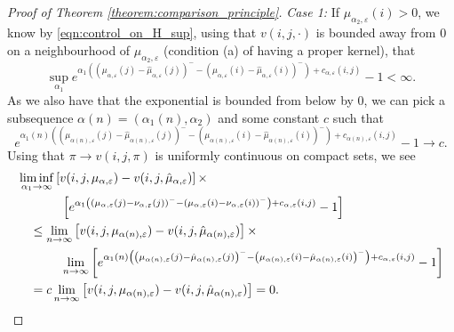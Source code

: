 \documentclass[a4paper]{article}
\numberwithin{equation}{section}
\theoremstyle{definition}
\begin{document}
\begin{proof}[Proof of Theorem \ref{theorem:comparison_principle}]
	\textit{Case 1:} If $\mu_{\alpha_2,\varepsilon}(i) > 0$, we know by \eqref{eqn:control_on_H_sup}, using that $v(i,j,\cdot)$ is bounded away from $0$ on a neighbourhood of $\mu_{\alpha_2,\varepsilon}$ (condition (a) of having a proper kernel), that 
	\begin{equation*}
		\sup_{\alpha_1} e^{\alpha_1\left(\left(\mu_{\alpha,\varepsilon}(j) - \hat{\mu}_{\alpha,\varepsilon}(j)\right)^- - \left(\mu_{\alpha,\varepsilon}(i) - \hat{\mu}_{\alpha,\varepsilon}(i)\right)^-\right) + c_{\alpha,\varepsilon}(i,j) } - 1 < \infty.
	\end{equation*}
	As we also have that the exponential is bounded from below by $0$, we can pick a subsequence $\alpha(n) = (\alpha_{1}(n),\alpha_2)$ and some constant $c$ such that 
	\begin{equation*}
		e^{\alpha_1(n) \left(\left(\mu_{\alpha(n),\varepsilon}(j) - \hat{\mu}_{\alpha(n),\varepsilon}(j)\right)^- - \left(\mu_{\alpha(n),\varepsilon}(i) - \hat{\mu}_{\alpha(n),\varepsilon}(i)\right)^-\right) + c_{\alpha(n),\varepsilon}(i,j) } - 1  \rightarrow c.
	\end{equation*}
	Using that $\pi \rightarrow v(i,j,\pi)$ is uniformly continuous on compact sets, we see 
	\begin{align*}
		& \liminf_{\alpha_1 \rightarrow \infty} \left[v(i,j,\mu_{\alpha,\varepsilon}) - v(i,j,\hat{\mu}_{\alpha,\varepsilon}) \right] \times \\
		& \hspace{3.5em} \left[e^{\alpha_1\left(\left(\mu_{\alpha,\varepsilon}(j) - \nu_{\alpha,\varepsilon}(j)\right)^- - \left(\mu_{\alpha,\varepsilon}(i) - \nu_{\alpha,\varepsilon}(i)\right)^-\right) +c_{\alpha,\varepsilon}(i,j)} - 1\right] \\
		& \quad \leq \lim_{n \rightarrow \infty} \left[v(i,j,\mu_{\alpha(n),\varepsilon}) - v(i,j,\hat{\mu}_{\alpha(n),\varepsilon}) \right] \times \\
		& \hspace{3.5em} \lim_{n \rightarrow \infty} \left[e^{\alpha_1(n)\left(\left(\mu_{\alpha(n),\varepsilon}(j) - \hat{\mu}_{\alpha(n),\varepsilon}(j)\right)^- - \left(\mu_{\alpha(n),\varepsilon}(i) - \hat{\mu}_{\alpha(n),\varepsilon}(i)\right)^-\right) + c_{\alpha,\varepsilon}(i,j)} - 1\right] \\
		& \quad = c \lim_{n \rightarrow \infty} \left[v(i,j,\mu_{\alpha(n),\varepsilon}) - v(i,j,\hat{\mu}_{\alpha(n),\varepsilon}) \right] = 0.
	\end{align*}
	

\end{proof}
\end{document}
